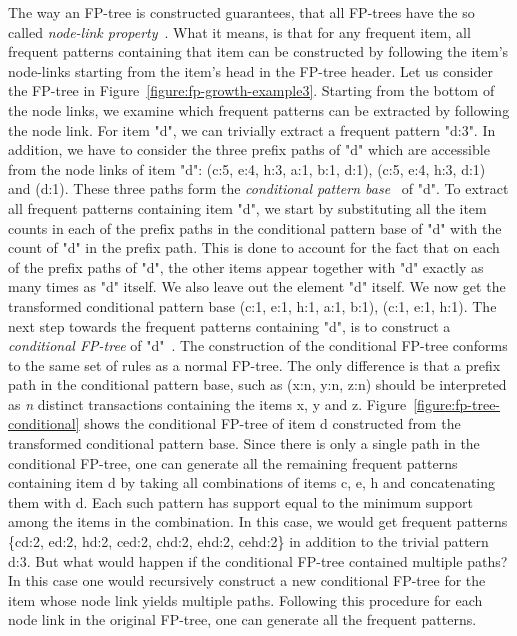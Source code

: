 The way an FP-tree is constructed guarantees, that all FP-trees have the so called \textit{node-link property}~\cite{Hipp:2000:AAR:360402.360421}. What it means, is that for any frequent item, all frequent patterns containing that item can be constructed by following the item's node-links starting from the item's head in the FP-tree header. Let us consider the FP-tree in Figure~\ref{figure:fp-growth-example3}. Starting from the bottom of the node links, we examine which frequent patterns can be extracted by following the node link. For item "d", we can trivially extract a frequent pattern "d:3". In addition, we have to consider the three prefix paths of "d" which are accessible from the node links of item "d": (c:5, e:4, h:3, a:1, b:1, d:1), (c:5, e:4, h:3, d:1) and (d:1). These three paths form the \textit{conditional pattern base}~\cite{Hipp:2000:AAR:360402.360421} of "d". To extract all frequent patterns containing item "d", we start by substituting all the item counts in each of the prefix paths in the conditional pattern base of "d" with the count of "d" in the prefix path. This is done to account for the fact that on each of the prefix paths of "d", the other items appear together with "d" exactly as many times as "d" itself. We also leave out the element "d" itself. We now get the transformed conditional pattern base (c:1, e:1, h:1, a:1, b:1), (c:1, e:1, h:1). The next step towards the frequent patterns containing "d", is to construct a \textit{conditional FP-tree} of "d"~\cite{Hipp:2000:AAR:360402.360421}. The construction of the conditional FP-tree conforms to the same set of rules as a normal FP-tree. The only difference is that a prefix path in the conditional pattern base, such as (x:n, y:n, z:n) should be interpreted as \textit{n} distinct transactions containing the items x, y and z. Figure~\ref{figure:fp-tree-conditional} shows the conditional FP-tree of item d constructed from the transformed conditional pattern base. Since there is only a single path in the conditional FP-tree, one can generate all the remaining frequent patterns containing item d by taking all combinations of items c, e, h and concatenating them with d. Each such pattern has support equal to the minimum support among the items in the combination. In this case, we would get frequent patterns \{cd:2, ed:2, hd:2, ced:2, chd:2, ehd:2, cehd:2\} in addition to the trivial pattern d:3. But what would happen if the conditional FP-tree contained multiple paths? In this case one would recursively construct a new conditional FP-tree for the item whose node link yields multiple paths. Following this procedure for each node link in the original FP-tree, one can generate all the frequent patterns.  

